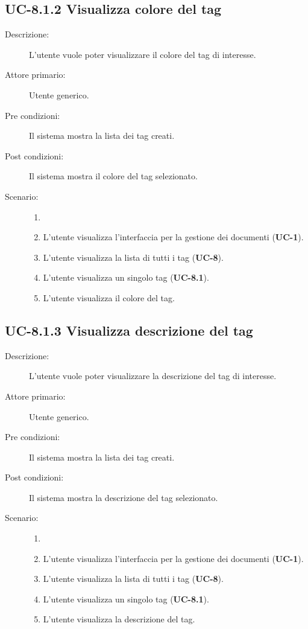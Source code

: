 \subsection{UC-8.1.2 Visualizza colore del tag}
\begin{description}
    \item[Descrizione:] L’utente vuole poter visualizzare il colore del tag di interesse.
    \item[Attore primario:] Utente generico.
    \item[Pre condizioni:] Il sistema mostra la lista dei tag creati.
    \item[Post condizioni:] Il sistema mostra il colore del tag selezionato.
    \item[Scenario:] 
    \begin{enumerate}
        \item[] 
        \item L’utente visualizza l'interfaccia per la gestione dei documenti (\textbf{UC-1}).
        \item L’utente visualizza la lista di tutti i tag (\textbf{UC-8}).
        \item L'utente visualizza un singolo tag (\textbf{UC-8.1}).
        \item L'utente visualizza il colore del tag.
    \end{enumerate}
\end{description}

\subsection{UC-8.1.3 Visualizza descrizione del tag}
\begin{description}
    \item[Descrizione:] L’utente vuole poter visualizzare la descrizione del tag di interesse.
    \item[Attore primario:] Utente generico.
    \item[Pre condizioni:] Il sistema mostra la lista dei tag creati.
    \item[Post condizioni:] Il sistema mostra la descrizione del tag selezionato.
    \item[Scenario:]
    \begin{enumerate}
        \item[] 
        \item L’utente visualizza l'interfaccia per la gestione dei documenti (\textbf{UC-1}).
        \item L’utente visualizza la lista di tutti i tag (\textbf{UC-8}).
        \item L'utente visualizza un singolo tag (\textbf{UC-8.1}).
        \item L'utente visualizza la descrizione del tag.
    \end{enumerate}
\end{description}

